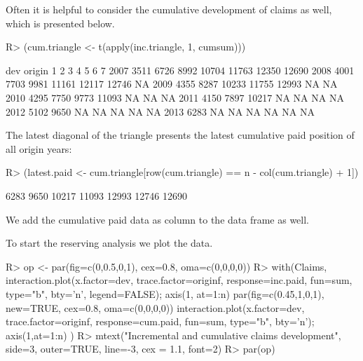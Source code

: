 \documentclass{article}
\begin{document}
Often it is helpful to consider the cumulative development of claims
as well, which is presented below.  
\begin{Schunk}
\begin{Sinput}
R> (cum.triangle <- t(apply(inc.triangle, 1, cumsum)))
\end{Sinput}
\begin{Soutput}
      dev
origin    1    2     3     4     5     6     7
  2007 3511 6726  8992 10704 11763 12350 12690
  2008 4001 7703  9981 11161 12117 12746    NA
  2009 4355 8287 10233 11755 12993    NA    NA
  2010 4295 7750  9773 11093    NA    NA    NA
  2011 4150 7897 10217    NA    NA    NA    NA
  2012 5102 9650    NA    NA    NA    NA    NA
  2013 6283   NA    NA    NA    NA    NA    NA
\end{Soutput}
\end{Schunk}
The latest diagonal of the triangle presents the latest cumulative paid 
position of all origin years:
\begin{Schunk}
\begin{Sinput}
R> (latest.paid <- cum.triangle[row(cum.triangle) == n - col(cum.triangle) + 1])
\end{Sinput}
\begin{Soutput}
[1]  6283  9650 10217 11093 12993 12746 12690
\end{Soutput}
\end{Schunk}
We add the cumulative paid data as column to the data frame as well.
\begin{Schunk}
\end{Schunk}
To start the reserving analysis we plot the data.
\begin{Schunk}
\begin{Sinput}
R> op <- par(fig=c(0,0.5,0,1), cex=0.8, oma=c(0,0,0,0))
R> with(Claims, {
     interaction.plot(x.factor=dev, trace.factor=originf, response=inc.paid, 
                      fun=sum, type="b", bty='n', legend=FALSE); axis(1, at=1:n)
     par(fig=c(0.45,1,0,1), new=TRUE, cex=0.8, oma=c(0,0,0,0))
     interaction.plot(x.factor=dev, trace.factor=originf, response=cum.paid, 
                      fun=sum, type="b", bty='n'); axis(1,at=1:n)
   })
R> mtext("Incremental and cumulative claims development", 
         side=3, outer=TRUE, line=-3, cex = 1.1, font=2)
R> par(op)
\end{Sinput}
\end{Schunk}
\end{document}
